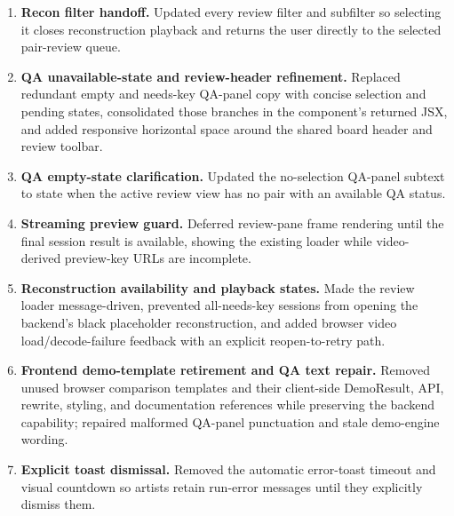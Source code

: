 \begin{enumerate}
  \item \textbf{Recon filter handoff.} Updated every review filter and subfilter so selecting it closes reconstruction playback and returns the user directly to the selected pair-review queue.

  \item \textbf{QA unavailable-state and review-header refinement.} Replaced redundant empty and needs-key QA-panel copy with concise selection and pending states, consolidated those branches in the component's returned JSX, and added responsive horizontal space around the shared board header and review toolbar.

  \item \textbf{QA empty-state clarification.} Updated the no-selection QA-panel subtext to state when the active review view has no pair with an available QA status.

  \item \textbf{Streaming preview guard.} Deferred review-pane frame rendering until the final session result is available, showing the existing loader while video-derived preview-key URLs are incomplete.

  \item \textbf{Reconstruction availability and playback states.} Made the review loader message-driven, prevented all-needs-key sessions from opening the backend's black placeholder reconstruction, and added browser video load/decode-failure feedback with an explicit reopen-to-retry path.

  \item \textbf{Frontend demo-template retirement and QA text repair.} Removed unused browser comparison templates and their client-side DemoResult, API, rewrite, styling, and documentation references while preserving the backend capability; repaired malformed QA-panel punctuation and stale demo-engine wording.

  \item \textbf{Explicit toast dismissal.} Removed the automatic error-toast timeout and visual countdown so artists retain run-error messages until they explicitly dismiss them.


\end{enumerate}
